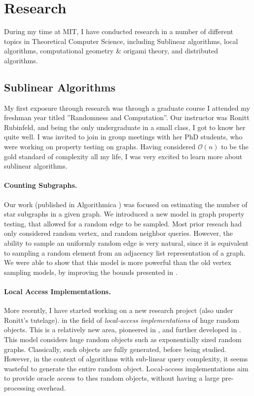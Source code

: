 \section*{Research}

During my time at MIT, I have conducted research in a number of different topics in Theoretical Computer Science,
including Sublinear algorithms, local algorithms, computational geometry \& origami theory, and distributed algorithms.

\subsection*{Sublinear Algorithms}
My first exposure through research was through a graduate course I attended my freshman year titled ''Randomness and Computation''.
Our instructor was Ronitt Rubinfeld, and being the only undergraduate in a small class, I got to know her quite well.
I was invited to join in group meetings with her PhD students, who were working on property testing on graphs.
Having considered $ \mathcal{O}(n) $ to be the gold standard of complexity all my life,
I was very excited to learn more about sublinear algorithms.

\paragraph{Counting Subgraphs.}
Our work (published in Algorithmica \cite{stars}) was focused on estimating the number of star subgraphs in a given graph.
We introduced a new model in graph property testing, that allowed for a random edge to be sampled.
Most prior reseach had only considered random vertex, and random neighbor queries.
However, the ability to sample an uniformly random edge is very natural,
since it is equivalent to sampling a random element from an adjacency list representation of a graph.
We were able to show that this model is more powerful than the old vertex sampling models,
by improving the bounds presented in \cite{old_stars}.

\paragraph{Local Access Implementations.}
More recently, I have started working on a new research project (also under Ronitt's tutelage).
in the field of \emph{local-access implementations} of huge random objects.
This is a relatively new area, pioneered in \cite{huge, huge_old}, and further developed in \cite{sparse, reut}.
This model considers huge random objects such as exponentially sized random graphs.
Classically, such objects are fully generated, before being studied.
However, in the context of algorithms with sub-linear query complexity, it seems wasteful to generate the entire random object.
Local-access implementations aim to provide oracle access to thes random objects,
without having a large pre-processing overhead.

